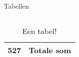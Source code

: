 \begin{frame}[fragile]{Tabellen}
\begin{columns}
\begin{column}{0.5\textwidth}
\begin{adjustbox}{frame=1pt 10pt}
\begin{minipage}{\textwidth-22pt}
\begin{table}[H]
\begin{tabular}{c c p{2cm}}
                            \multicolumn{2}{c}{527} & Totale som\\
                            \bottomrule
                        \end{tabular}
                        \caption{Een tabel!}
                    \end{table}
                    \vspace{-20pt}
                \end{minipage}
            \end{adjustbox}
        \end{column}
    \end{columns}
\end{frame}


